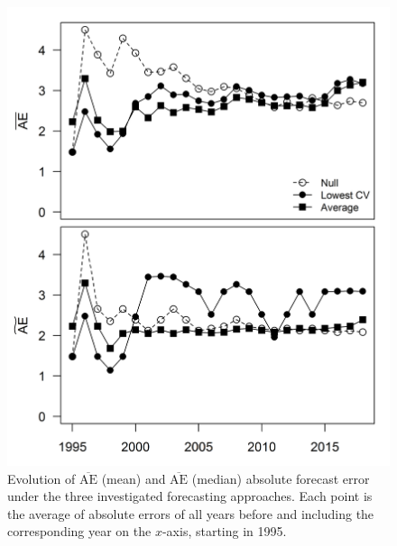 \documentclass[12pt,]{book}
\theoremstyle{definition}
\theoremstyle{definition}
\theoremstyle{definition}
\theoremstyle{remark}
\begin{document}
\begin{figure}
  \centering
  \includegraphics{img/Ch2/ae-changes.png}
  \caption{Evolution of $\overline{\text{AE}}$ (mean) and  $\overline{\text{AE}}$ (median) absolute forecast error under the three investigated forecasting approaches. Each point is the average of absolute errors of all years before and including the corresponding year on the $x$-axis, starting in 1995.}
  \label{fig:ae-changes}
\end{figure}

\clearpage
\end{document}
